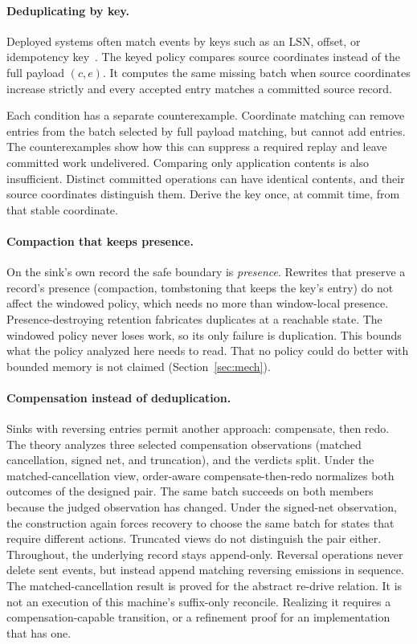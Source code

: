 \documentclass[sigplan,10pt]{acmart}
\theoremstyle{plain}
\theoremstyle{definition}
\begin{document}
\paragraph{Deduplicating by key.}
Deployed systems often match events by keys such as an LSN, offset,
or idempotency key~\cite{stripe}. The keyed policy compares source
coordinates instead of the full payload $(c,e)$. It computes the
same missing batch when source coordinates increase strictly and
every accepted entry matches a committed source record.

Each condition has a separate counterexample. Coordinate matching can remove entries from the batch selected by
full payload matching, but cannot add entries. The counterexamples
show how this can suppress a required replay and leave committed work
undelivered. Comparing only application contents is
also insufficient. Distinct committed operations can have identical
contents, and their source coordinates distinguish them. Derive the
key once, at commit time, from that stable coordinate.

\paragraph{Compaction that keeps presence.}
On the sink's own record the safe boundary is \emph{presence}.
Rewrites that preserve a record's presence (compaction, tombstoning
that keeps the key's entry) do not affect the windowed policy,
which needs no more than window-local presence. Presence-destroying
retention fabricates duplicates at a reachable state. The windowed
policy never loses work, so its only failure is duplication. This
bounds what the policy analyzed here needs to read. That
no policy could do better with bounded memory is not claimed
(Section~\ref{sec:mech}).

\paragraph{Compensation instead of deduplication.}
Sinks with reversing entries permit another approach: compensate,
then redo. The theory analyzes three selected compensation
observations (matched cancellation, signed net, and truncation), and
the verdicts split. Under the matched-cancellation view, order-aware
compensate-then-redo normalizes both outcomes of the designed pair.
The same batch succeeds on both members because the judged observation
has changed. Under the signed-net observation, the construction again forces
recovery to choose the same batch for states that require different
actions. Truncated views do not distinguish the pair either. Throughout, the underlying record
stays append-only. Reversal operations never delete sent events, but instead append matching
reversing emissions in sequence. The matched-cancellation result is proved for
the abstract re-drive
relation. It is not an execution of this machine's suffix-only reconcile. Realizing it
requires a compensation-capable transition, or a refinement proof for
an implementation that has one.
\end{document}
